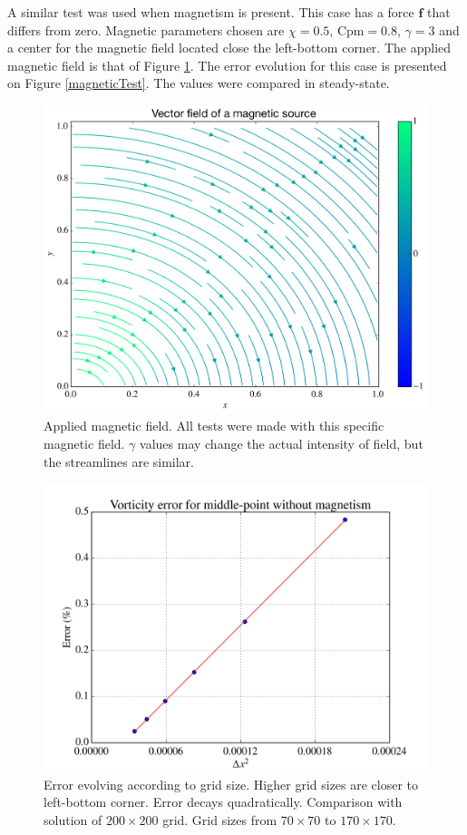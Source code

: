 \documentclass[journal]{IEEEtran}
\begin{document}
A similar test was used when magnetism is present. This case has a force $\mathbf{f}$ that differs from zero. Magnetic parameters chosen are $\chi=0.5$, $\mathrm{Cpm}=0.8$, $\gamma=3$ and a center for the magnetic field located close the left-bottom corner. The applied magnetic field is that of Figure \ref{magneticField}. The error evolution for this case is presented on Figure \ref{magneticTest}. The values were compared in steady-state.

\begin{figure}[!t]
\centering
\includegraphics[width=\linewidth]{figures/vectorFieldH}
\caption{Applied magnetic field. All tests were made with this specific magnetic field. $\gamma$ values may change the actual intensity of field, but the streamlines are similar.\label{magneticField}}
\end{figure}


\begin{figure}[!t]
\centering
\includegraphics[width=\linewidth]{figures/validateHydrodynamicsRe40}
\caption{Error evolving according to grid size. Higher grid sizes are closer to left-bottom corner. Error decays quadratically. Comparison with solution of $200\times 200$ grid. Grid sizes from $70\times 70$ to $170\times 170$. \label{hydrodynamicsTest}}
\end{figure}
\end{document}
